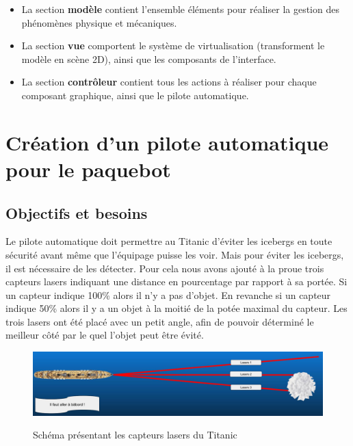 \documentclass[a4paper,11pt]{article}
\begin{document}
    \begin{itemize}
        \item La section \textbf{modèle} contient l'ensemble éléments pour réaliser la gestion des phénomènes physique et mécaniques.
        \item La section \textbf{vue} comportent le système de virtualisation (transforment le modèle en scène 2D), ainsi que les composants de l'interface.
        \item La section \textbf{contrôleur} contient tous les actions à réaliser pour chaque composant graphique, ainsi que le pilote automatique.
    \end{itemize}

    \section{Création d'un pilote automatique pour le paquebot}

    \subsection{Objectifs et besoins}

    Le pilote automatique doit permettre au Titanic d’éviter les icebergs en toute sécurité avant même que l'équipage puisse les voir.
    Mais pour éviter les icebergs, il est nécessaire de les détecter. Pour cela nous avons ajouté à la proue trois capteurs lasers indiquant une distance en pourcentage par rapport à sa portée.
    Si un capteur indique 100\% alors il n'y a pas d'objet. En revanche si un capteur indique 50\% alors il y a un objet à la moitié de la potée maximal du capteur. Les trois lasers ont été placé avec un petit angle, afin de pouvoir déterminé le meilleur côté par le quel l'objet peut être évité.

    \begin{figure}[H]
        \begin{center}
            \caption{Schéma présentant les capteurs lasers du Titanic}
            \includegraphics[scale=0.26]{assets/Lasers_Illustration.jpg}
            \label{fig:titanicLasers}
        \end{center}
    \end{figure}
\end{document}
